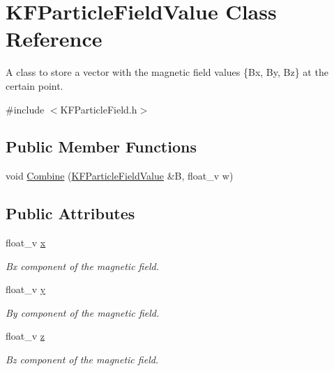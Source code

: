 \hypertarget{classKFParticleFieldValue}{}\section{K\+F\+Particle\+Field\+Value Class Reference}
\label{classKFParticleFieldValue}


A class to store a vector with the magnetic field values \{Bx, By, Bz\} at the certain point.  




{\ttfamily \#include $<$K\+F\+Particle\+Field.\+h$>$}

\subsection*{Public Member Functions}
\begin{DoxyCompactItemize}
\item 
void \hyperlink{classKFParticleFieldValue_ab297633c377ddca9d3f0560b1cf1b22b}{Combine} (\hyperlink{classKFParticleFieldValue}{K\+F\+Particle\+Field\+Value} \&B, float\+\_\+v w)
\end{DoxyCompactItemize}
\subsection*{Public Attributes}
\begin{DoxyCompactItemize}
\item 
float\+\_\+v \hyperlink{classKFParticleFieldValue_aa826517f61e63113724b7b8361161415}{x}\hypertarget{classKFParticleFieldValue_aa826517f61e63113724b7b8361161415}{}\label{classKFParticleFieldValue_aa826517f61e63113724b7b8361161415}

\begin{DoxyCompactList}\small\item\em Bx component of the magnetic field. \end{DoxyCompactList}\item 
float\+\_\+v \hyperlink{classKFParticleFieldValue_aa4da996ece6ba721c4b46908c5923e52}{y}\hypertarget{classKFParticleFieldValue_aa4da996ece6ba721c4b46908c5923e52}{}\label{classKFParticleFieldValue_aa4da996ece6ba721c4b46908c5923e52}

\begin{DoxyCompactList}\small\item\em By component of the magnetic field. \end{DoxyCompactList}\item 
float\+\_\+v \hyperlink{classKFParticleFieldValue_a1d32fe48416b2955df3a8b58a1db1165}{z}\hypertarget{classKFParticleFieldValue_a1d32fe48416b2955df3a8b58a1db1165}{}\label{classKFParticleFieldValue_a1d32fe48416b2955df3a8b58a1db1165}

\begin{DoxyCompactList}\small\item\em Bz component of the magnetic field. \end{DoxyCompactList}\end{DoxyCompactItemize}
